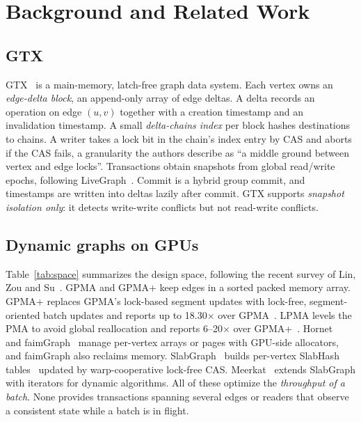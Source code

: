 \documentclass[sigconf,nonacm]{acmart}
\begin{document}
\section{Background and Related Work}
\label{sec:related}

\subsection{GTX}
GTX~\cite{gtx} is a main-memory, latch-free graph data system. Each vertex owns an \emph{edge-delta block}, an
append-only array of edge deltas. A delta records an operation on edge $(u,v)$ together with a creation timestamp and
an invalidation timestamp. A small \emph{delta-chains index} per block hashes destinations to chains. A writer takes
a lock bit in the chain's index entry by CAS and aborts if the CAS fails, a granularity the authors describe as
``a middle ground between vertex and edge locks''. Transactions obtain snapshots from global read/write epochs,
following LiveGraph~\cite{livegraph}. Commit is a hybrid group commit, and timestamps are written into deltas lazily
after commit. GTX supports \emph{snapshot isolation only}: it detects write-write conflicts but not read-write
conflicts.

\subsection{Dynamic graphs on GPUs}
Table~\ref{tab:space} summarizes the design space, following the recent survey of Lin, Zou and Su~\cite{survey25}.
GPMA and GPMA+ keep edges in a sorted packed memory array. GPMA+ replaces GPMA's lock-based segment updates with
lock-free, segment-oriented batch updates and reports up to 18.30$\times$ over GPMA~\cite{gpma,gpmatr}. LPMA levels
the PMA to avoid global reallocation and reports 6--20$\times$ over GPMA+~\cite{lpma}. Hornet~\cite{hornet} and
faimGraph~\cite{faimgraph} manage per-vertex arrays or pages with GPU-side allocators, and faimGraph also reclaims
memory. SlabGraph~\cite{slabgraph} builds per-vertex SlabHash tables~\cite{slabhash} updated by warp-cooperative
lock-free CAS. Meerkat~\cite{meerkat} extends SlabGraph with iterators for dynamic algorithms. All of these optimize
the \emph{throughput of a batch}. None provides transactions spanning several edges or readers that observe a
consistent state while a batch is in flight.
\end{document}
